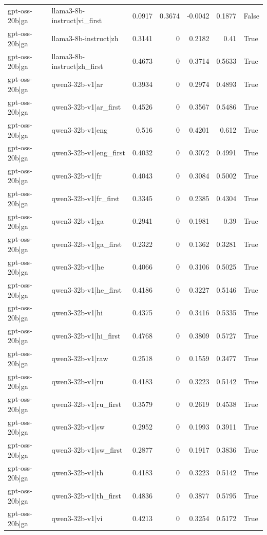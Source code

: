 \begin{table}
\begin{tabular}{l l r r r r l}
gpt-oss-20b|ga & llama3-8b-instruct|vi_first & 0.0917 & 0.3674 & -0.0042 & 0.1877 & False \\
gpt-oss-20b|ga & llama3-8b-instruct|zh & 0.3141 & 0 & 0.2182 & 0.41 & True \\
gpt-oss-20b|ga & llama3-8b-instruct|zh_first & 0.4673 & 0 & 0.3714 & 0.5633 & True \\
gpt-oss-20b|ga & qwen3-32b-v1|ar & 0.3934 & 0 & 0.2974 & 0.4893 & True \\
gpt-oss-20b|ga & qwen3-32b-v1|ar_first & 0.4526 & 0 & 0.3567 & 0.5486 & True \\
gpt-oss-20b|ga & qwen3-32b-v1|eng & 0.516 & 0 & 0.4201 & 0.612 & True \\
gpt-oss-20b|ga & qwen3-32b-v1|eng_first & 0.4032 & 0 & 0.3072 & 0.4991 & True \\
gpt-oss-20b|ga & qwen3-32b-v1|fr & 0.4043 & 0 & 0.3084 & 0.5002 & True \\
gpt-oss-20b|ga & qwen3-32b-v1|fr_first & 0.3345 & 0 & 0.2385 & 0.4304 & True \\
gpt-oss-20b|ga & qwen3-32b-v1|ga & 0.2941 & 0 & 0.1981 & 0.39 & True \\
gpt-oss-20b|ga & qwen3-32b-v1|ga_first & 0.2322 & 0 & 0.1362 & 0.3281 & True \\
gpt-oss-20b|ga & qwen3-32b-v1|he & 0.4066 & 0 & 0.3106 & 0.5025 & True \\
gpt-oss-20b|ga & qwen3-32b-v1|he_first & 0.4186 & 0 & 0.3227 & 0.5146 & True \\
gpt-oss-20b|ga & qwen3-32b-v1|hi & 0.4375 & 0 & 0.3416 & 0.5335 & True \\
gpt-oss-20b|ga & qwen3-32b-v1|hi_first & 0.4768 & 0 & 0.3809 & 0.5727 & True \\
gpt-oss-20b|ga & qwen3-32b-v1|raw & 0.2518 & 0 & 0.1559 & 0.3477 & True \\
gpt-oss-20b|ga & qwen3-32b-v1|ru & 0.4183 & 0 & 0.3223 & 0.5142 & True \\
gpt-oss-20b|ga & qwen3-32b-v1|ru_first & 0.3579 & 0 & 0.2619 & 0.4538 & True \\
gpt-oss-20b|ga & qwen3-32b-v1|sw & 0.2952 & 0 & 0.1993 & 0.3911 & True \\
gpt-oss-20b|ga & qwen3-32b-v1|sw_first & 0.2877 & 0 & 0.1917 & 0.3836 & True \\
gpt-oss-20b|ga & qwen3-32b-v1|th & 0.4183 & 0 & 0.3223 & 0.5142 & True \\
gpt-oss-20b|ga & qwen3-32b-v1|th_first & 0.4836 & 0 & 0.3877 & 0.5795 & True \\
gpt-oss-20b|ga & qwen3-32b-v1|vi & 0.4213 & 0 & 0.3254 & 0.5172 & True \\

\end{tabular}
\end{table}
